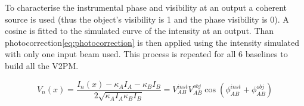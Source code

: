 To characterise the instrumental phase and visibility at an output a coherent source is used (thus the object's visibility is 1 and the phase visibility is 0). A cosine is fitted to the simulated curve of the intensity at an output. Than photocorrection\ref{eq:photocorrection} is then applied using the intensity simulated with only one input beam used. This process is repeated for all 6 baselines to build all the V2PM. 

\begin{equation}
 \label{eq:photocorrection}
 V_n(x) = \frac{I_n(x)-\kappa_AI_A-\kappa_BI_B}{2\sqrt{\kappa_AI_A\kappa_BI_B}} = V_{AB}^{inst}V_{AB}^{obj}\cos(\phi_{AB}^{inst}+\phi_{AB}^{obj})
\end{equation}




